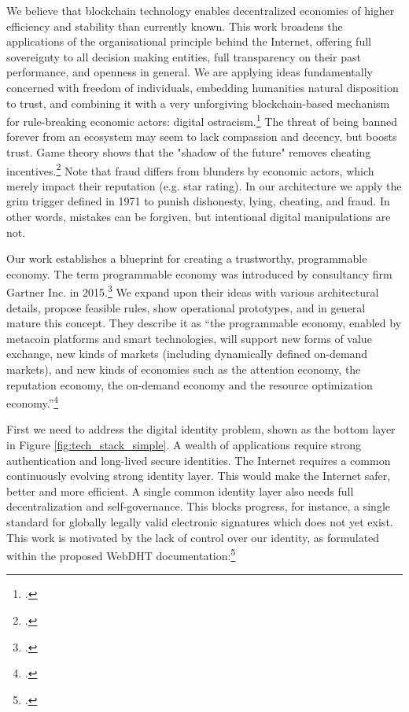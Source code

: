 \documentclass[USenglish]{article}
\begin{document}
We believe that blockchain technology enables decentralized economies of higher efficiency and stability than currently known. 
This work broadens the applications of the organisational principle behind the Internet, offering full sovereignty to all decision making entities, full transparency on their past performance, and openness in general.
We are applying ideas fundamentally concerned with freedom of individuals, embedding humanities natural disposition to trust, and combining it with a very unforgiving blockchain-based mechanism for rule-breaking economic actors: digital ostracism.\footcite{bicchieri2004trust}
The threat of being banned forever from an ecosystem may seem to lack compassion and decency, but boosts trust. 
Game theory shows that the "shadow of the future" removes cheating incentives.\footcite{friedman1971non}
Note that fraud differs from blunders by economic actors, which merely impact their reputation (e.g. star rating).
In our architecture we apply the grim trigger defined in 1971 to punish dishonesty, lying, cheating, and fraud.
In other words, mistakes can be forgiven, but intentional digital manipulations are not.

Our work establishes a blueprint for creating a trustworthy, programmable economy.
The term programmable economy was introduced by consultancy firm Gartner Inc. in 2015.\footcite{gartner2016programmable} 
We expand upon their ideas with various architectural details, propose feasible rules, show operational prototypes, and in general mature this concept.
They describe it as ``the programmable economy, enabled by metacoin platforms and smart technologies, will support new forms of value exchange, new kinds of markets (including dynamically defined on-demand markets), and new kinds of economies such as the attention economy, the reputation economy, the on-demand economy and the resource optimization economy.''\footcite{gartnerprogrammableeconomy}

First we need to address the digital identity problem, shown as the bottom layer in Figure \ref{fig:tech_stack_simple}.
A wealth of applications require strong authentication and long-lived secure identities.
The Internet requires a common continuously evolving strong identity layer.
This would make the Internet safer, better and more efficient.
A single common identity layer also needs full decentralization and self-governance.
This blocks progress, for instance, a single standard for globally legally valid electronic signatures which does not yet exist.
This work is motivated by the lack of control over our identity, as formulated within the proposed WebDHT documentation:\footcite{webdhtproposal}
\end{document}
